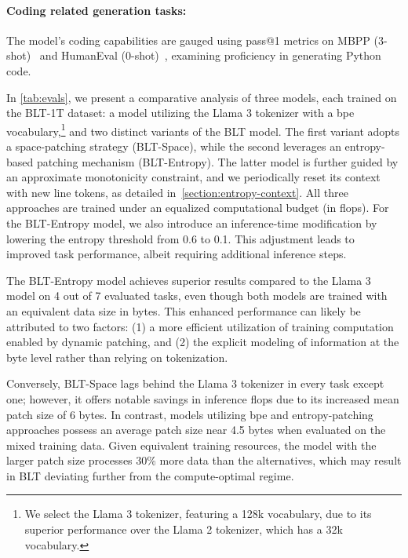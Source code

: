 \paragraph{Coding related generation tasks:}  The model’s coding capabilities are gauged using pass@1 metrics on MBPP (3-shot)~\citep{Eval_MBPP} and HumanEval (0-shot)~\citep{Eval_HumanEval}, examining proficiency in generating Python code.

In \autoref{tab:evals}, we present a comparative analysis of three models, each trained on the {\textsc BLT}-1T dataset: a model utilizing the Llama 3 tokenizer with a bpe vocabulary,\footnote{We select the Llama 3 tokenizer, featuring a 128k vocabulary, due to its superior performance over the Llama 2 tokenizer, which has a 32k vocabulary.} and two distinct variants of the {\textsc BLT} model. The first variant adopts a space-patching strategy ({\textsc BLT}-Space), while the second leverages an entropy-based patching mechanism ({\textsc BLT}-Entropy). The latter model is further guided by an approximate monotonicity constraint, and we periodically reset its context with new line tokens, as detailed in~\autoref{section:entropy-context}. All three approaches are trained under an equalized computational budget (in flops). For the {\textsc BLT}-Entropy model, we also introduce an inference-time modification by lowering the entropy threshold from 0.6 to 0.1. This adjustment leads to improved task performance, albeit requiring additional inference steps.

The {\textsc BLT}-Entropy model achieves superior results compared to the Llama 3 model on 4 out of 7 evaluated tasks, even though both models are trained with an equivalent data size in bytes. This enhanced performance can likely be attributed to two factors: (1) a more efficient utilization of training computation enabled by dynamic patching, and (2) the explicit modeling of information at the byte level rather than relying on tokenization.

Conversely, {\textsc BLT}-Space lags behind the Llama 3 tokenizer in every task except one; however, it offers notable savings in inference flops due to its increased mean patch size of 6 bytes. In contrast, models utilizing bpe and entropy-patching approaches possess an average patch size near 4.5 bytes when evaluated on the mixed training data. Given equivalent training resources, the model with the larger patch size processes 30\% more data than the alternatives, which may result in {\textsc BLT} deviating further from the compute-optimal regime.

